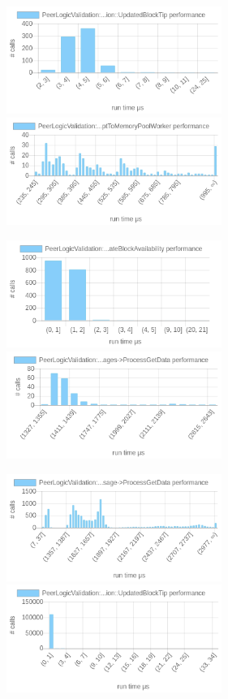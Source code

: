 \documentclass{article}
\begin{document}
\includegraphics[width=7cm]{images/mumbai/chartPeerLogicValidation_3A_3AProcessMessages-_3EProcessMessage-_3EProcessMessage-_3EPeerLogicValidation_3A_3AUpdatedBlockTip.png}
\includegraphics[width=7cm]{images/mumbai/chartPeerLogicValidation_3A_3AProcessMessages-_3EProcessMessage-_3EAcceptToMemoryPoolWithTime-_3EAcceptToMemoryPoolWorker.png}

\includegraphics[width=7cm]{images/mumbai/chartPeerLogicValidation_3A_3AProcessMessages-_3EProcessMessage-_3EUpdateBlockAvailability.png}
\includegraphics[width=7cm]{images/mumbai/chartPeerLogicValidation_3A_3AProcessMessages-_3EProcessGetData.png}

\includegraphics[width=7cm]{images/mumbai/chartPeerLogicValidation_3A_3AProcessMessages-_3EProcessMessage-_3EProcessGetData.png}
\includegraphics[width=7cm]{images/mumbai/chartPeerLogicValidation_3A_3AProcessMessages-_3EProcessMessage-_3EPeerLogicValidation_3A_3AUpdatedBlockTip.png}
\end{document}
